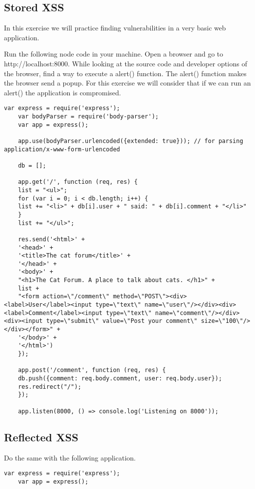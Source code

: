 
\begin{Exercise}[label={websec-xss-types}]
	\subsection{Stored XSS}
	In this exercise we will practice finding vulnerabilities in a very basic web application.
	
	Run the following node code in your machine. Open a browser and go to http://localhost:8000. While looking at the source code and developer options of the browser, find a way to execute a alert() function. The alert() function makes the browser send a popup. For this exercise we will consider that if we can run an alert() the application is compromised.
	
	\begin{lstlisting}[style=JavaScript]
	var express = require('express');
	var bodyParser = require('body-parser');
	var app = express();

	app.use(bodyParser.urlencoded({extended: true})); // for parsing application/x-www-form-urlencoded
	
	db = [];
	
	app.get('/', function (req, res) {
	list = "<ul>";
	for (var i = 0; i < db.length; i++) {
	list += "<li>" + db[i].user + " said: " + db[i].comment + "</li>"
	}
	list += "</ul>";
	
	res.send('<html>' +
	'<head>' +
	'<title>The cat forum</title>' +
	'</head>' +
	'<body>' +
	"<h1>The Cat Forum. A place to talk about cats. </h1>" +
	list +
	"<form action=\"/comment\" method=\"POST\"><div><label>User</label><input type=\"text\" name=\"user\"/></div><div><label>Comment</label><input type=\"text\" name=\"comment\"/></div><div><input type=\"submit\" value=\"Post your comment\" size=\"100\"/></div></form>" +
	'</body>' +
	'</html>')
	});
	
	app.post('/comment', function (req, res) {
	db.push({comment: req.body.comment, user: req.body.user});
	res.redirect("/");
	});
	
	app.listen(8000, () => console.log('Listening on 8000'));
	\end{lstlisting}
	
	\subsection{Reflected XSS}
		Do the same with the following application.
	\begin{lstlisting}[style=JavaScript]
	var express = require('express');
	var app = express();
	

\end{lstlisting}
\end{Exercise}
